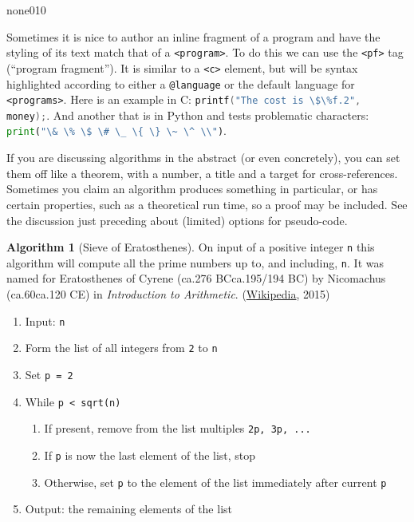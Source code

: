 \documentclass{amsart}
\theoremstyle{plain}%
\theoremstyle{definition}%
\newtheorem{algorithm}[theorem]{Algorithm}
\theoremstyle{remark}%
\newcommand{\mono}[1]{\texttt{#1}}
\newcommand{\pubtitle}[1]{\textsl{#1}}
\numberwithin{equation}{section}
\newcommand{\programfragment}[2]{\lstinline[language=#1, style=programcodestyle, basicstyle=\ttfamily]#2}
\begin{document}
\begin{program}{none}{0}{1}{0}

\end{program}
Sometimes it is nice to author an inline fragment of a program and have the styling of its text match that of a \mono{<program>}. To do this we can use the \mono{<pf>} tag (``program fragment'').  It is similar to a \mono{<c>} element, but will be syntax highlighted according to either a \mono{@language} or the default language for \mono{<programs>}. Here is an example in C: \programfragment{C}{`printf("The cost is \$\%f.2", money);`}. And another that is in Python and tests problematic characters: \programfragment{Python}{`print("\& \% \$ \# \_ \{ \} \~ \^ \\")`}.%
\par
If you are discussing algorithms in the abstract (or even concretely), you can set them off like a theorem, with a number, a title and a target for cross-references.  Sometimes you claim an algorithm produces something in particular, or has certain properties, such as a theoretical run time, so a proof may be included.  See the discussion just preceding about (limited) options for pseudo-code.%
\begin{algorithm}[Sieve of Eratosthenes]\label{algorithm-sieve-eratosthenes}%
%
On input of a positive integer \mono{n} this algorithm will compute all the prime numbers up to, and including, \mono{n}.  It was named for Eratosthenes of Cyrene (ca.\@ 276 BC\textendash{}ca.\@ 195\slash{}194 BC) by Nicomachus (ca.\@ 60\textendash{}ca.\@ 120 CE) in \pubtitle{Introduction to Arithmetic}. (\href{http://en.wikipedia.org/wiki/Sieve_of_Eratosthenes}{Wikipedia}\footnotemark{}, 2015)%
\begin{enumerate}
\item{}Input: \mono{n}%
\item{}Form the list of all integers from \mono{2} to \mono{n}%
\item{}Set \mono{p = 2}%
\item{}While \mono{p < sqrt(n)}%
\begin{enumerate}[label={\arabic*.}]
\item{}If present, remove from the list multiples \mono{2p, 3p, ...}%
\item{}If \mono{p} is now the last element of the list, stop%
\item{}Otherwise, set \mono{p} to the element of the list immediately after current \mono{p}%
\end{enumerate}
%
\item{}Output: the remaining elements of the list%
\end{enumerate}
%
\end{algorithm}
\end{document}
